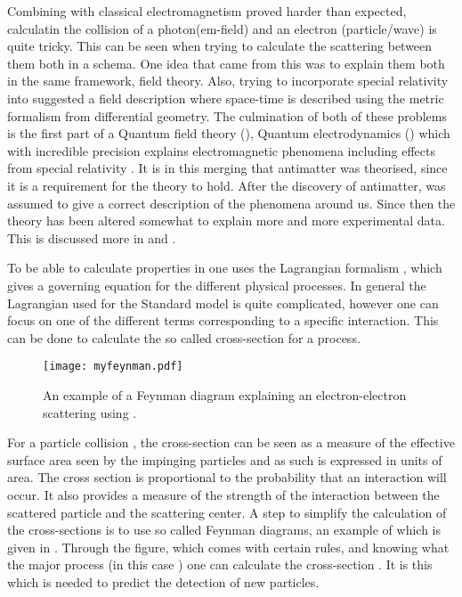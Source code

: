 Combining \abbrQM with classical electromagnetism proved harder than expected, calculatin the collision of a photon(em-field) and an electron (particle/wave) is quite tricky. This can be seen when trying to calculate the scattering between them both in a \abbrQM schema. One idea that came from this was to explain them both in the same framework, field theory. Also, trying to incorporate special relativity into \abbrQM suggested a field description where space-time is described using the metric formalism from differential geometry.
The culmination of both of these problems is the first part of a Quantum field theory (\abbrQFT), Quantum electrodynamics (\abbrQED) which with incredible precision explains electromagnetic phenomena including effects from special relativity \citep{Zee:2003}. It is in this merging that antimatter was theorised, since it is a requirement for the theory to hold. After the discovery of antimatter, \abbrQED was assumed to give a correct description of the phenomena around us. Since then the theory has been altered somewhat to explain more and more experimental data. This is discussed more in  and .

To be able to calculate properties in \abbrQFT one uses the Lagrangian formalism \citep{Goldstein:2001}, which gives a governing equation for the different physical processes. In general the Lagrangian used for the Standard model is quite complicated, however one can focus on one of the different terms corresponding to a specific interaction. This can be done to calculate the so called cross-section for a process. 

\begin{SCfigure}[][h]
 \centering
 \texttt{[image: myfeynman.pdf]}
  \caption{{\small An example of a Feynman diagram explaining an electron-electron scattering using \abbrQED.}}
    \label{fig:exFeynman}
\end{SCfigure}

For a particle collision \citep{Herr:2006}, the cross-section can be seen as a measure of the effective surface area seen by the impinging particles and as such is expressed in units of area. The cross section is proportional to the probability that an interaction will occur. It also provides a measure of the strength of the interaction between the scattered particle and the scattering center. A step to simplify the calculation of the cross-sections is to use so called Feynman diagrams, an example of which is given in . Through the figure, which comes with certain rules, and knowing what the major process (in this case \abbrQED) one can calculate the cross-section \citep{Zee:2003,Herr:2006}. It is this which is needed to predict the detection of new particles. 

